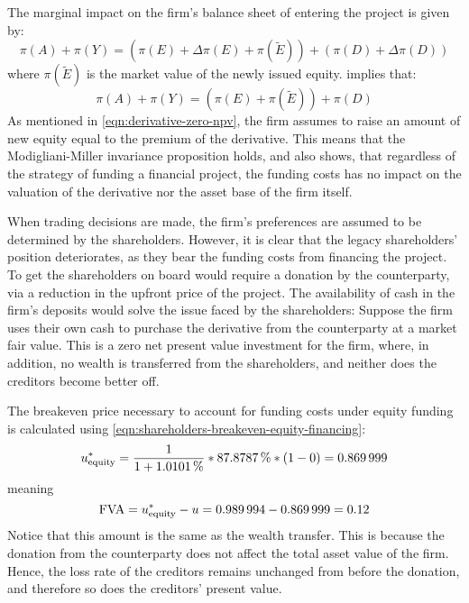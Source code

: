 \documentclass[main.tex]{subfiles}
\begin{document}
        The marginal impact on the firm's balance sheet of entering the project is given by:
        \begin{equation}
            \pi(A) + \pi(Y) = (\pi(E) + \Delta \pi(E) + \pi(\tilde{E})) + (\pi(D) + \Delta \pi(D))
        \end{equation}
        where $\pi(\tilde{E})$ is the market value of the newly issued equity. 
         implies that:
        \begin{equation}
            \pi(A) + \pi(Y) = (\pi(E) + \pi(\tilde{E})) + \pi(D)
        \end{equation}
        As mentioned in \cref{eqn:derivative-zero-npv}, the firm assumes to raise an amount of new equity equal to the premium of the derivative. 
        This means that the Modigliani-Miller invariance proposition holds, and also shows, that regardless of the strategy of funding a financial project, the funding costs has no impact on the valuation of the derivative nor the asset base of the firm itself.

        When trading decisions are made, the firm's preferences are assumed to be determined by the shareholders.
        However, it is clear that the legacy shareholders' position deteriorates, 
        as they bear the funding costs from financing the project. \\
        To get the shareholders on board would require a donation by the counterparty, 
        via a reduction in the upfront price of the project.
        The availability of cash in the firm's deposits would solve the issue faced by the shareholders:
        Suppose the firm uses their own cash to purchase the derivative from the counterparty at a market fair value.
        This is a zero net present value investment for the firm, where, in addition, no wealth is transferred from the shareholders, and neither does the creditors become better off. 

        The breakeven price necessary to account for funding costs under equity funding is calculated using
        \cref{eqn:shareholders-breakeven-equity-financing}:
            \begin{equation}
                    u^{\ast}_{\text{equity}} 
                =
                    \frac{1}{1 + \pct{0.010101}} 
                    *
                    \pct{0.878787}
                    *
                    \left(
                        \num{1}
                        -
                        \num{0}
                    \right)
                =
                    \num{0.869999}
            \end{equation}
        meaning 
        \begin{equation}
            \FVA/ = u^{\ast}_{\text{equity}} - u =
            \num{0.989994}-\num{0.869999} =
            \num{0.12}
        \end{equation}
        Notice that this amount is the same as the wealth transfer.
        This is because the donation from the counterparty does not affect the total asset value of the firm.
        Hence, the loss rate of the creditors remains unchanged from before the donation, and therefore so does the creditors' present value.
\end{document}
